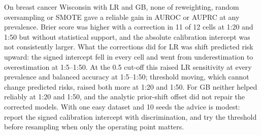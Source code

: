 On breast cancer Wisconsin with LR and GB, none of reweighting, random oversampling or SMOTE gave a reliable gain in AUROC or AUPRC at any prevalence. Brier score was higher with a correction in 11 of 12 cells at 1:20 and 1:50 but without statistical support, and the absolute calibration intercept was not consistently larger. What the corrections did for LR was shift predicted risk upward: the signed intercept fell in every cell and went from underestimation to overestimation at 1:5--1:50. At the 0.5 cut-off this raised LR sensitivity at every prevalence and balanced accuracy at 1:5--1:50; threshold moving, which cannot change predicted risks, raised both more at 1:20 and 1:50. For GB neither helped reliably at 1:20 and 1:50, and the analytic prior-shift offset did not repair the corrected models. With one easy dataset and 10 seeds the advice is modest: report the signed calibration intercept with discrimination, and try the threshold before resampling when only the operating point matters.

